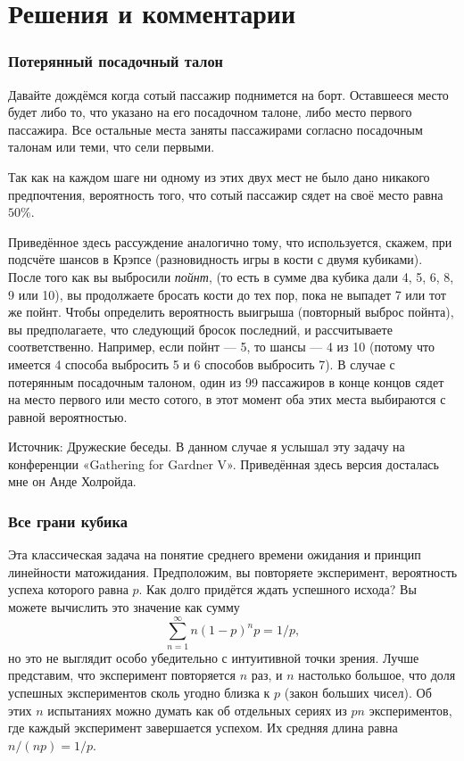 \section*{Решения и комментарии}

\subsubsection*{Потерянный посадочный талон}%

Давайте дождёмся когда сотый пассажир поднимется на борт. 
Оставшееся место будет либо то, что указано на его посадочном талоне, либо место первого пассажира.
Все остальные места заняты пассажирами согласно посадочным талонам или теми, что сели первыми.

Так как на каждом шаге ни одному из этих двух мест не было дано никакого предпочтения, вероятность того, что сотый пассажир сядет на своё место равна $50\%$.
\heart

Приведённое здесь рассуждение аналогично тому, что используется, скажем, при подсчёте шансов в Крэпсе (разновидность игры в кости с двумя кубиками).
После того как вы выбросили \emph{пойнт},
(то есть в сумме два кубика дали 4, 5, 6, 8, 9 или 10), вы продолжаете бросать кости до тех пор, пока не выпадет 7 или тот же пойнт.
Чтобы определить вероятность выигрыша (повторный выброс пойнта), вы предполагаете, что следующий бросок последний, и рассчитываете соответственно.
Например, если пойнт --- 5, то шансы --- 4 из 10 (потому что имеется 4 способа выбросить 5 и 6 способов выбросить 7).
В случае с потерянным посадочным талоном, один из 99 пассажиров в конце концов сядет на место первого или место сотого, в этот момент оба этих места выбираются с равной вероятностью. 

\medskip

Источник: Дружеские беседы.
В данном случае я услышал эту задачу на конференции «Gathering for Gardner V».
Приведённая здесь версия досталась мне он Анде Холройда. %

\subsubsection*{Все грани кубика}%

Эта классическая задача на понятие среднего времени ожидания и принцип линейности матожидания.
Предположим, вы повторяете эксперимент, вероятность успеха которого равна $p$.
Как долго придётся ждать успешного исхода? Вы можете вычислить это значение как сумму
\[\sum_{n=1}^\infty n(1-p)^np=1/p,\]
но это не выглядит особо убедительно с интуитивной точки зрения.
Лучше представим, что эксперимент повторяется $n$ раз, и $n$ настолько большое, что доля успешных экспериментов сколь угодно близка к $p$ (закон больших чисел).
Об этих $n$ испытаниях можно думать как об отдельных сериях из $pn$ экспериментов, где каждый эксперимент завершается успехом.
Их средняя длина равна $n/(np)=1/p$.

